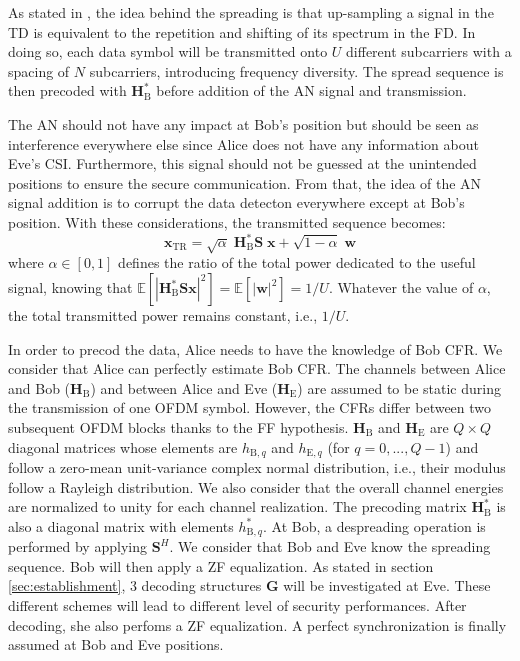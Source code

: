 \documentclass[journal,comsoc]{IEEEtran}
\newcommand{\module}[1]{\left|#1\right|}
\newcommand{\EX}[1]{\mathbb{E} \left[#1\right]}%
\newcommand{\HE}{\textbf{H}_{\text{E}}}
\newcommand{\HB}{\textbf{H}_{\text{B}}}
\newcommand{\spread}{\textbf{S}}
\newcommand{\w}{\textbf{w}}
\begin{document}
As stated in \cite{nguyen2019frequency}, the idea behind the spreading is that up-sampling a signal in the TD is equivalent to the repetition and shifting of its spectrum in the FD. In doing so, each data symbol will be transmitted onto $U$ different subcarriers with a spacing of $N$ subcarriers, introducing frequency diversity. The spread sequence is then precoded with $\HB^*$ before addition of the AN signal  and transmission. 

The AN should not have any impact at Bob's position but should be seen as interference everywhere else since Alice does not have any information about Eve's CSI. Furthermore, this signal should not be guessed at the unintended positions to ensure the secure communication. From that, the idea of the AN signal addition is to corrupt the data detecton everywhere except at Bob's position. With these considerations, the transmitted sequence becomes:
\begin{equation}
\textbf{x}_{\text{TR}} = \sqrt{\alpha} \;\HB^*  \spread\; \textbf{x} +  \sqrt{1-\alpha} \; \w
\label{eq:sym_rad_AN}
\end{equation} 
where $\alpha \in [0,1]$ defines the ratio of the total power dedicated to the useful signal, knowing that $\EX{\module{\HB^*\spread\textbf{x}}^2} = \EX{\module{\w}^2} = 1/U$. Whatever the value of $\alpha$, the total transmitted power remains constant, i.e., $1/U$.

In order to precod the data, Alice needs to have the knowledge of Bob CFR. We consider that Alice can perfectly estimate Bob CFR. The channels between Alice and Bob ($\HB$) and between Alice and Eve ($\HE$) are assumed to be static during the transmission of one OFDM symbol. However, the CFRs differ between two subsequent OFDM blocks thanks to the FF hypothesis. $\HB$ and $\HE$ are $Q\times Q$ diagonal matrices whose elements are $h_{\text{B},q}$ and $h_{\text{E},q}$ (for $q = 0,...,Q-1$) and follow a zero-mean unit-variance complex normal distribution, i.e., their modulus follow a Rayleigh distribution. We also consider that the overall channel energies are normalized to unity for each channel realization. The precoding matrix $\HB^*$ is also a diagonal matrix with elements $h_{\text{B},q}^*$. At Bob, a despreading operation is performed by applying $\spread^H$. We consider that Bob and Eve know the spreading sequence. Bob will then apply a ZF equalization.  As stated in section \ref{sec:establishment}, 3 decoding structures $\textbf{G}$ will be investigated at Eve. These different schemes will lead to different level of security performances. After decoding, she also perfoms a ZF equalization. A perfect synchronization is finally assumed at Bob and Eve positions.\\
\end{document}
